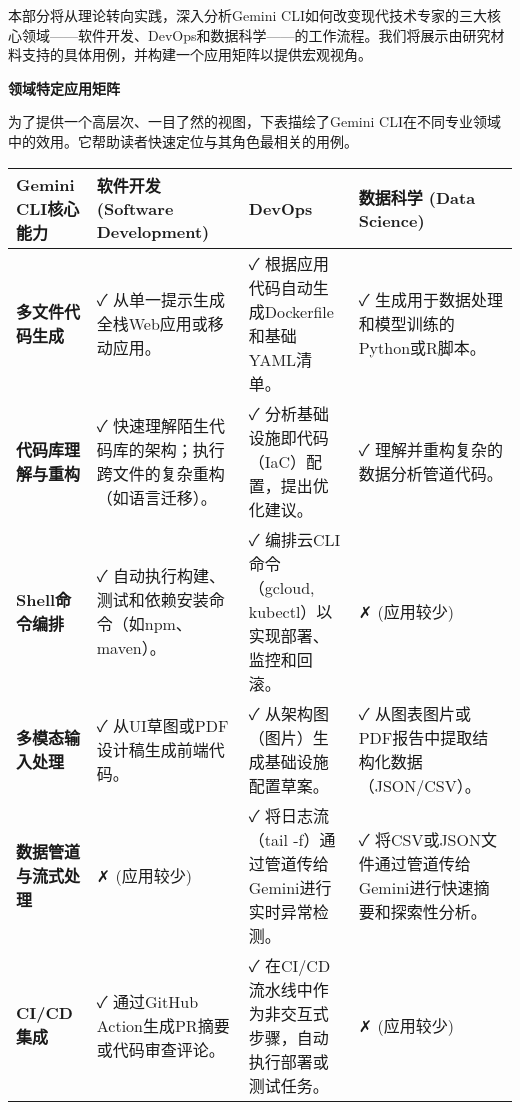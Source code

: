 \documentclass[a4paper,12pt]{article}
\begin{document}
\begin{multicols}{2}
    本部分将从理论转向实践，深入分析Gemini
    CLI如何改变现代技术专家的三大核心领域------软件开发、DevOps和数据科学------的工作流程。我们将展示由研究材料支持的具体用例，并构建一个应用矩阵以提供宏观视角。

    \textbf{领域特定应用矩阵}

    为了提供一个高层次、一目了然的视图，下表描绘了Gemini
    CLI在不同专业领域中的效用。它帮助读者快速定位与其角色最相关的用例。

    \begin{longtable}[]{@{}
      >{\raggedright\arraybackslash}p{}
      >{\raggedright\arraybackslash}p{}
      >{\raggedright\arraybackslash}p{}
      >{\raggedright\arraybackslash}p{}@{}}
    \toprule\noalign{}
    \begin{minipage}[b]{\linewidth}\raggedright
    Gemini CLI核心能力
    \end{minipage} & \begin{minipage}[b]{\linewidth}\raggedright
    软件开发 (Software Development)
    \end{minipage} & \begin{minipage}[b]{\linewidth}\raggedright
    DevOps
    \end{minipage} & \begin{minipage}[b]{\linewidth}\raggedright
    数据科学 (Data Science)
    \end{minipage} \\
    \midrule\noalign{}
    \endhead
    \bottomrule\noalign{}
    \endlastfoot
    \textbf{多文件代码生成} & ✓ 从单一提示生成全栈Web应用或移动应用。 &
    ✓ 根据应用代码自动生成Dockerfile和基础YAML清单。 & ✓
    生成用于数据处理和模型训练的Python或R脚本。 \\
    \textbf{代码库理解与重构} & ✓
    快速理解陌生代码库的架构；执行跨文件的复杂重构（如语言迁移）。 & ✓
    分析基础设施即代码（IaC）配置，提出优化建议。 & ✓
    理解并重构复杂的数据分析管道代码。 \\
    \textbf{Shell命令编排} & ✓
    自动执行构建、测试和依赖安装命令（如npm、maven）。 & ✓
    编排云CLI命令（gcloud, kubectl）以实现部署、监控和回滚。 & ✗
    (应用较少) \\
    \textbf{多模态输入处理} & ✓ 从UI草图或PDF设计稿生成前端代码。 & ✓
    从架构图（图片）生成基础设施配置草案。 & ✓
    从图表图片或PDF报告中提取结构化数据（JSON/CSV）。 \\
    \textbf{数据管道与流式处理} & ✗ (应用较少) & ✓ 将日志流（tail
    -f）通过管道传给Gemini进行实时异常检测。 & ✓
    将CSV或JSON文件通过管道传给Gemini进行快速摘要和探索性分析。 \\
    \textbf{CI/CD集成} & ✓ 通过GitHub Action生成PR摘要或代码审查评论。 &
    ✓ 在CI/CD流水线中作为非交互式步骤，自动执行部署或测试任务。 & ✗
    (应用较少) \\
    \end{longtable}


\end{multicols}
\end{document}
